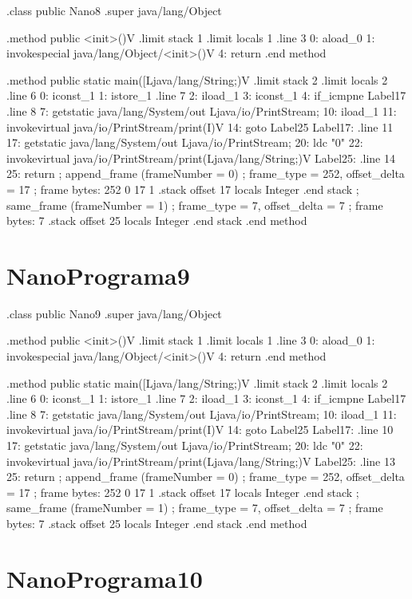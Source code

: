 \documentclass[12pt,a4paper,twoside]{report}
\begin{document}
\begin{terminal}
.class public Nano8
.super java/lang/Object

.method public <init>()V
  .limit stack 1
  .limit locals 1
  .line 3
  0: aload_0
  1: invokespecial java/lang/Object/<init>()V
  4: return
.end method

.method public static main([Ljava/lang/String;)V
  .limit stack 2
  .limit locals 2
  .line 6
  0: iconst_1
  1: istore_1
  .line 7
  2: iload_1
  3: iconst_1
  4: if_icmpne Label17
  .line 8
  7: getstatic java/lang/System/out Ljava/io/PrintStream;
  10: iload_1
  11: invokevirtual java/io/PrintStream/print(I)V
  14: goto Label25
Label17:
  .line 11
  17: getstatic java/lang/System/out Ljava/io/PrintStream;
  20: ldc "0"
  22: invokevirtual java/io/PrintStream/print(Ljava/lang/String;)V
Label25:
  .line 14
  25: return
  ; append_frame (frameNumber = 0)
  ; frame_type = 252, offset_delta = 17
  ; frame bytes: 252 0 17 1
  .stack
    offset 17
    locals Integer
    .end stack
  ; same_frame (frameNumber = 1)
  ; frame_type = 7, offset_delta = 7
  ; frame bytes: 7
  .stack
    offset 25
    locals Integer
    .end stack
.end method
\end{terminal}\section{NanoPrograma9}
\begin{terminal}
.class public Nano9
.super java/lang/Object

.method public <init>()V
  .limit stack 1
  .limit locals 1
  .line 3
  0: aload_0
  1: invokespecial java/lang/Object/<init>()V
  4: return
.end method

.method public static main([Ljava/lang/String;)V
  .limit stack 2
  .limit locals 2
  .line 6
  0: iconst_1
  1: istore_1
  .line 7
  2: iload_1
  3: iconst_1
  4: if_icmpne Label17
  .line 8
  7: getstatic java/lang/System/out Ljava/io/PrintStream;
  10: iload_1
  11: invokevirtual java/io/PrintStream/print(I)V
  14: goto Label25
Label17:
  .line 10
  17: getstatic java/lang/System/out Ljava/io/PrintStream;
  20: ldc "0"
  22: invokevirtual java/io/PrintStream/print(Ljava/lang/String;)V
Label25:
  .line 13
  25: return
  ; append_frame (frameNumber = 0)
  ; frame_type = 252, offset_delta = 17
  ; frame bytes: 252 0 17 1
  .stack
    offset 17
    locals Integer
    .end stack
  ; same_frame (frameNumber = 1)
  ; frame_type = 7, offset_delta = 7
  ; frame bytes: 7
  .stack
    offset 25
    locals Integer
    .end stack
.end method
\end{terminal}\section{NanoPrograma10}
\end{document}
